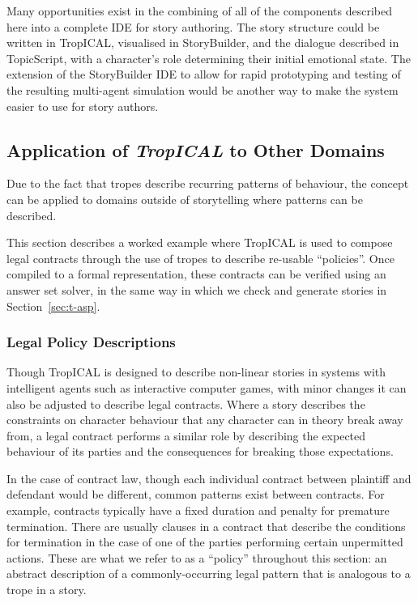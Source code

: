 \documentclass[11pt]{report}
\begin{document}
Many opportunities exist in the combining of all of the components described
here into a complete IDE for story authoring. The story structure could be
written in TropICAL, visualised in StoryBuilder, and the dialogue described in
TopicScript, with a character's role determining their initial emotional state.
The extension of the StoryBuilder IDE to allow for rapid prototyping and testing
of the resulting multi-agent simulation would be another way to make the system
easier to use for story authors.

\subsection{Application of \emph{TropICAL} to Other Domains}
\label{sec:future-domains}

Due to the fact that tropes describe recurring patterns of behaviour, the concept can be
applied to domains outside of storytelling where patterns can be described.

This section describes a worked example where TropICAL is used to compose legal
contracts through the use of tropes to describe re-usable ``policies''. Once
compiled to a formal representation, these contracts can be verified using an
answer set solver, in the same way in which we check and generate stories in Section~\ref{sec:t-asp}.

\subsubsection{Legal Policy Descriptions}
\label{sec:t-legal}
Though TropICAL is designed to describe non-linear stories in systems with
intelligent agents such as
interactive computer games, with minor changes it can also be adjusted to
describe legal contracts. Where a story describes the constraints on character
behaviour that any character can in theory break away from, a legal contract
performs a similar role by describing the expected behaviour of its parties and
the consequences for breaking those expectations.

In the case of contract law, though each individual contract between plaintiff and
defendant would be different, common patterns exist between contracts. For
example, contracts typically have a fixed duration and penalty for premature
termination. There are usually clauses in a contract that describe the
conditions for termination in the case of one of the parties performing certain
unpermitted actions. These are what we refer to as a ``policy'' throughout this section: an abstract description of
a commonly-occurring legal pattern that is analogous to a trope in a story.
\end{document}
